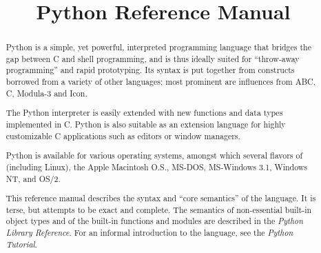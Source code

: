 \documentclass{manual}
\title{Python Reference Manual}
\begin{document}
\maketitle



\begin{abstract}

\noindent
Python is a simple, yet powerful, interpreted programming language
that bridges the gap between C and shell programming, and is thus
ideally suited for ``throw-away programming'' and rapid prototyping.
Its syntax is put together from constructs borrowed from a variety of
other languages; most prominent are influences from ABC, C, Modula-3
and Icon.

The Python interpreter is easily extended with new functions and data
types implemented in C.  Python is also suitable as an extension
language for highly customizable C applications such as editors or
window managers.

Python is available for various operating systems, amongst which
several flavors of {\UNIX} (including Linux), the Apple Macintosh O.S.,
MS-DOS, MS-Windows 3.1, Windows NT, and OS/2.

This reference manual describes the syntax and ``core semantics'' of
the language.  It is terse, but attempts to be exact and complete.
The semantics of non-essential built-in object types and of the
built-in functions and modules are described in the {\em Python
Library Reference}.  For an informal introduction to the language, see
the {\em Python Tutorial}.

\end{abstract}

\tableofcontents



\end{document}
